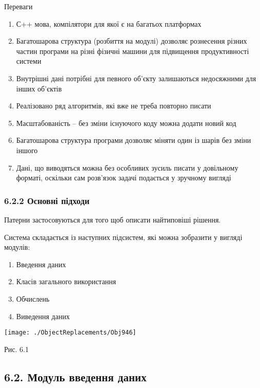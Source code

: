 Переваги

\begin{enumerate}
\def\labelenumi{\arabic{enumi}.}
\tightlist
\item
  С++ мова, компілятори для якої є на багатьох платформах
\item
  Багатошарова структура (розбиття на модулі) дозволяє рознесення різних
  частин програми на різні фізичні машини для підвищення продуктивності
  системи
\item
  Внутрішні дані потрібні для певного об'єкту залишаються недосяжними
  для інших об'єктів
\item
  Реалізовано ряд алгоритмів, які вже не треба повторно писати
\item
  Масштабованість -- без зміни існуючого коду можна додати новий код
\item
  Багатошарова структура програми дозволяє міняти один із шарів без
  зміни іншого
\item
  Дані, що виводяться можна без особливих зусиль писати у довільному
  форматі, оскільки сам розв'язок задачі подається у зручному вигляді
\end{enumerate}

\hypertarget{ux43eux441ux43dux43eux432ux43dux456-ux43fux456ux434ux445ux43eux434ux438}{%
\subsubsection{6.2.2 Основні
підходи}\label{ux43eux441ux43dux43eux432ux43dux456-ux43fux456ux434ux445ux43eux434ux438}}

Патерни застосовуються для того щоб описати найтиповіші рішення.

Система складається із наступних підсистем, які можна зобразити у
вигляді модулів:

\begin{enumerate}
\def\labelenumi{\arabic{enumi}.}
\tightlist
\item
  Введення даних
\item
  Класів загального використання
\item
  Обчислень
\item
  Виведення даних
\end{enumerate}

\texttt{[image: ./ObjectReplacements/Obj946]}

Рис. 6.1

\hypertarget{ux43cux43eux434ux443ux43bux44c-ux432ux432ux435ux434ux435ux43dux43dux44f-ux434ux430ux43dux438ux445}{%
\subsection[6.2. Модуль введення
даних]{\texorpdfstring{\protect\hypertarget{anchor-69}{}{}6.2. Модуль
введення
даних}{6.2. Модуль введення даних}}\label{ux43cux43eux434ux443ux43bux44c-ux432ux432ux435ux434ux435ux43dux43dux44f-ux434ux430ux43dux438ux445}}

